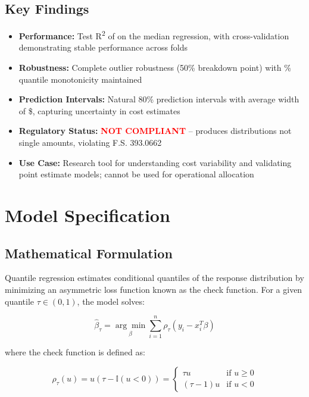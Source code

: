 \subsection{Key Findings}

\begin{itemize}
\item \textbf{Performance:} Test R\textsuperscript{2} of \ModelSevenRSquaredTest{} on the median regression, with cross-validation demonstrating stable performance across folds
\item \textbf{Robustness:} Complete outlier robustness (50\% breakdown point) with \ModelSevenQuantileMonotonicity\% quantile monotonicity maintained
\item \textbf{Prediction Intervals:} Natural 80\% prediction intervals with average width of \$\ModelSevenPredictionIntervalWidth, capturing uncertainty in cost estimates
\item \textbf{Regulatory Status:} \textcolor{red}{\textbf{NOT COMPLIANT}} -- produces distributions not single amounts, violating F.S. 393.0662
\item \textbf{Use Case:} Research tool for understanding cost variability and validating point estimate models; cannot be used for operational allocation
\end{itemize}

\section{Model Specification}

\subsection{Mathematical Formulation}

Quantile regression estimates conditional quantiles of the response distribution by minimizing an asymmetric loss function known as the check function. For a given quantile $\tau \in (0,1)$, the model solves:

\begin{equation}
\hat{\beta}_{\tau} = \underset{\beta}{\arg\min} \sum_{i=1}^{n} \rho_{\tau}(y_i - x_i^T\beta)
\end{equation}

where the check function is defined as:

\begin{equation}
\rho_{\tau}(u) = u(\tau - \mathbb{I}(u < 0)) = 
\begin{cases}
\tau u & \text{if } u \geq 0 \\
(\tau - 1) u & \text{if } u < 0
\end{cases}
\end{equation}


